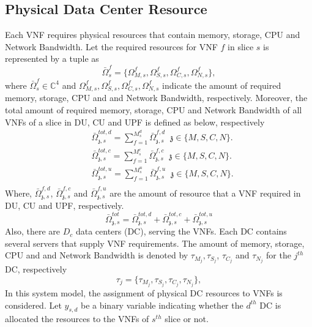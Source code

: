 \documentclass[conference]{IEEEtran}
\begin{document}
\subsection{Physical Data Center Resource}
Each VNF requires
physical resources that contain memory, storage, CPU and Network Bandwidth.
Let the required resources for VNF $f$ in slice $s$ is represented by a tuple as
\begin{equation}
\bar{\Omega}_{s}^f = \{\Omega_{M,{s}}^f, \Omega_{S,{s}}^f, \Omega_{C,{s}}^f, \Omega_{N,{s}}^f \},
\end{equation}
where $\bar{\Omega}_{s}^f\in \mathbb{C}^{4}$ and $\Omega_{M,{s}}^f, \Omega_{S,{s}}^f, \Omega_{C,{s}}^f, \Omega_{N,{s}}^f$ indicate the amount of required memory, storage, CPU and and Network Bandwidth, respectively.
Moreover, the total amount of required memory, storage, CPU and Network Bandwidth of all VNFs of a slice in DU, CU and UPF is defined as below, respectively
\begin{equation}
\begin{split}
&\bar{\Omega}_{\mathfrak{z},s}^{tot,d} = \sum_{f=1}^{M_{s}^d}\bar{\Omega}_{\mathfrak{z},s}^{f,d} \;\; \mathfrak{z} \in \{M, S, C, N\}.\\
&\bar{\Omega}_{\mathfrak{z},s}^{tot,c} = \sum_{f=1}^{M_{s}^c}\bar{\Omega}_{\mathfrak{z},s}^{f,c} \;\; \mathfrak{z} \in \{M, S, C, N\}.\\
&\bar{\Omega}_{\mathfrak{z},s}^{tot,u} = \sum_{f=1}^{M_{s}^u}\bar{\Omega}_{\mathfrak{z},s}^{f,u} \;\; \mathfrak{z} \in \{M, S, C, N\}.\\
\end{split}
\end{equation}
Where, $\bar{\Omega}_{\mathfrak{z},s}^{f,d}$, $\bar{\Omega}_{\mathfrak{z},s}^{f,c}$ and $\bar{\Omega}_{\mathfrak{z},s}^{f,u}$ are the amount of resource that a VNF required in DU, CU and UPF, respectively.
\begin{equation}
 \bar{\Omega}_{\mathfrak{z},s}^{tot} = \bar{\Omega}_{\mathfrak{z},s}^{tot,d}+ \bar{\Omega}_{\mathfrak{z},s}^{tot,c}+\bar{\Omega}_{\mathfrak{z},s}^{tot,u}
\end{equation} 
Also, there are $D_c$ data centers (DC), serving the VNFs. Each DC contains several servers that supply VNF requirements.
The amount of memory, storage, CPU and and Network Bandwidth is denoted by $\tau_{M_{j}}, \tau_{S_{j}}$, $\tau_{C_{j}} $ and $\tau_{N_{j}} $ for the $j^{th}$ DC, respectively
\begin{equation*}
\tau_j = \{\tau_{M_{j}}, \tau_{S_{j}}, \tau_{C_{j}}, \tau_{N_{j}} \},
\end{equation*}
In this system model, the assignment of physical DC resources to VNFs is considered. Let $y_{s,d}$ be a binary variable indicating whether the $d^{th}$ DC is allocated the resources to the VNFs of $s^{th}$ slice or not.
\end{document}
